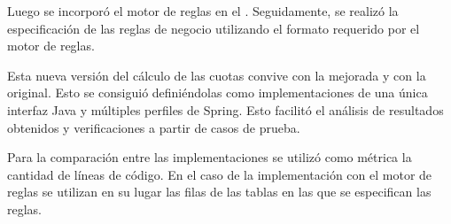 Luego se incorporó el motor de reglas en el {\SIDOSPU}.
Seguidamente, se realizó la especificación de las reglas de negocio utilizando el formato requerido por el motor de reglas.

Esta nueva versión del cálculo de las cuotas convive con la mejorada y con la original. 
Esto se consiguió definiéndolas como implementaciones de una única interfaz Java y múltiples perfiles de Spring. 
Esto facilitó el análisis de resultados obtenidos y verificaciones a partir de casos de prueba. 

Para la comparación entre las implementaciones se utilizó como métrica la cantidad de líneas de código.  
En el caso de la implementación con el motor de reglas se utilizan en su lugar las filas de las tablas en las que se especifican las reglas.
